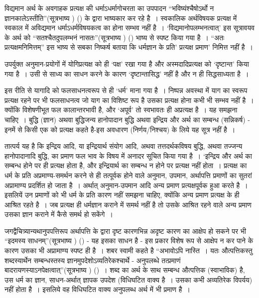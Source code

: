 \newpage

विद्यमान अर्थ के अवगाहक प्रत्यक्ष की धर्माऽधर्मागोचरता का उपपादन “भविष्यंश्चैषोऽर्थो न ज्ञानकालेऽस्तीति”(सूत्रभाष्य ) () के द्वारा भाष्यकार कर रहे है~। स्वकालिक अर्थविषयक प्रत्यक्ष में स्वकाल में अविद्यमान धर्माऽधर्मविषयकत्व का होना सम्भव नहीं है~। ‘विद्यमानोपलम्भनत्वात्' इस सूत्रावयव के अर्थ को “सतश्चैतदुपलम्भनं नासतः”(सूत्रभाष्य ) () भाष्य से स्पष्ट किया गया है~। “अतः प्रत्यक्षमनिमित्तम्” इस भाष्य से सबका निष्कर्ष बताया कि धर्मज्ञान के प्रति' प्रत्यक्ष प्रमाण' निमित्त नहीं है~।

उपर्युक्त अनुमान-प्रयोगों में योगिप्रत्यक्ष को ही ‘पक्ष' रखा गया है और अस्मदादिप्रत्यक्ष को ‘दृष्टान्त' किया गया है~। उसी से साध्य का साधन करने के कारण ‘दृष्टान्तासिद्ध' नहीं है और न ही सिद्धसाध्यता है~।

इस रीति से यागादि को फलसाधनत्वरूप से ही ‘धर्म' माना गया है~। निष्पन्न अवस्था में याग का स्वरूप प्रत्यक्ष रहने पर भी फलसाधनत्व जो याग का विशिष्ट रूप है उसका प्रत्यक्ष होना कभी भी सम्भव नहीं है~। क्योंकि विशेषणीभूत फल कालान्तरभावी है, और ‘अपूर्व' तो स्वभावतः ही अप्रत्यक्ष है~। यह समझना चाहिए~। बुद्धि (ज्ञान) अथवा बुद्धिजन्य हानोपादान बुद्धि अथवा इन्द्रिय और अर्थ का सम्बन्ध (सन्निकर्ष) - इनमें से किसी एक को प्रत्यक्ष कहते है-इस अवधारण (निर्णय/निश्चय) के लिये यह सूत्र नहीं है~। 

तात्पर्य यह है कि इन्द्रिय आदि, या इन्द्रियार्थ संयोग आदि, अथवा तत्तदर्थकविषय बुद्धि, अथवा तज्जन्य हानोपादानादि बुद्धि, का प्रमाण फल भाव के विषय में अनादर सूचित किया गया है~। ‘इन्द्रिय और अर्थ का सम्बन्ध होने पर ही प्रत्यक्ष होता है, और इन्द्रियार्थ का सम्बन्ध न होने पर प्रत्यक्ष नहीं होता~। प्रत्यक्ष का धर्म के प्रति अप्रमाण्य-समर्थन करने से ही तत्पूर्वक होने वाले अनुमान, उपमान, अर्थापत्ति प्रमाणों का सुतरां अप्रामाण्य प्रदर्शित हो जाता है~। अर्थात् अनुमान-उपमान आदि अन्य प्रमाण प्रत्यक्षपूर्वक हुआ करते है~। इसलियें उन प्रमाणों को भी धर्म के प्रति कारण नहीं समझना चाहिए, क्योंकि अन्य प्रमाण प्रत्यक्ष के ही आश्रित रहते है~। जब प्रत्यक्ष ही धर्मज्ञान कराने में समर्थ नहीं है तो उसके आश्रित रहने वाले अन्य प्रमाण उसका ज्ञान कराने में कैसे समर्थ हो सकेंगे~। 

जगद्वैचित्र्यान्यथानुपपत्तिरूप अर्थापत्ति के द्वारा दृष्ट कारणभिन्न अदृष्ट कारण का आक्षेप हो सकने पर भी “इदमस्य साधनम्”(सूत्रभाष्य ) () - यह इसका साधन है - इस प्रकार विशेष रूप से आक्षेप न कर पाने के कारण उसका भी अप्रामाण्य स्पष्ट ही है~। शबर स्वामी कहते है “अभावोऽपि नास्ति~। यतः औत्पत्तिकस्तु शब्दस्यार्थेन सम्बन्धस्तस्य ज्ञानमुपदेशोऽव्यतिरेकश्चार्थे - अनुपलब्धे तत्प्रमाणं बादरायणस्याऽनपेक्षत्वात्”(सूत्रभाष्य ) ()~। शब्द का अर्थ के साथ सम्बन्ध औत्पत्तिक (स्वाभाविक) है, उस धर्म का ज्ञान, साधन-अर्थात् ज्ञापक उपदेश (विधिघटित वाक्य है~। उसका कभी अव्यतिरेक विपर्यय) नहीं होता है~। इसलिये वह विधिघटित वाक्य अनुपलब्ध अर्थ में भी प्रमाण है~।


